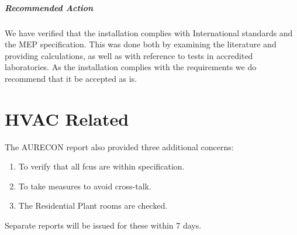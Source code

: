 \paragraph{Recommended Action}  We have verified that the installation complies with International standards and the MEP specification. This was done both by examining the literature and providing calculations, as well as with reference to tests in accredited laboratories. As the installation complies with the requirements we do recommend that it be accepted as is. 




\chapter{HVAC Related}

The AURECON report also provided three additional concerns:
 
\begin{enumerate}
\item To verify that all fcus are within specification.
\item To take measures to avoid cross-talk.
\item The Residential Plant rooms are checked.
\end{enumerate}

Separate reports will be issued for these within 7 days.

\endinput
\luadirect{
local pi = math.pi
K=1
d = 0.050
n = 0.011
Pw = pi*d/2
A = (pi*d*d/4)/2
R = pi*(d)/2
S= 1/50 
Q=(K/n)*math.pow(R,2/3)*math.pow(S,0.5)*A
velocity = Q/A
nee = 8.90e-4
reynolds = (velocity * Pw)/nee
tex.print("flow", Q,velocity, reynolds)

}





